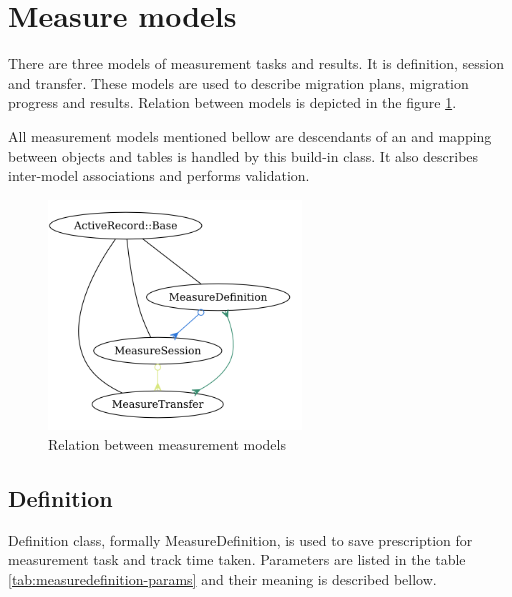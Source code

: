 \section{Measure models}
There are three models of measurement tasks and results. It is definition, session and transfer. These models are used to describe migration plans, migration progress and results. 
Relation between models is depicted in the figure \ref{img:themis-models-brief}.

All measurement models mentioned bellow are descendants of an  and mapping between objects and tables is handled by this build-in class. It also describes inter-model associations and performs validation. 

\begin{figure}[htb]
	\begin{center}
	\includegraphics[width=0.6\textwidth]{models_brief.png}
	\end{center}
	\caption{Relation between measurement models}
	\label{img:themis-models-brief}
\end{figure}


\subsection{Definition}
Definition class, formally MeasureDefinition, is used to save prescription for measurement task and track time taken. Parameters are listed in the table \ref{tab:measuredefinition-params} and their meaning is described bellow.

